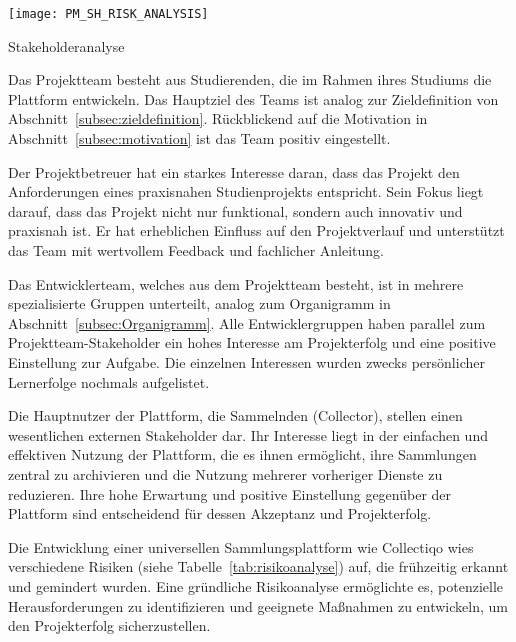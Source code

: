 \begin{table}[h!]
    \centering
    \texttt{[image: PM\_SH\_RISK\_ANALYSIS]}
    \caption{Stakeholderanalyse}\label{tab:stakeholderanalyse}
\end{table}

Das Projektteam besteht aus Studierenden, die im Rahmen ihres Studiums die Plattform entwickeln.
Das Hauptziel des Teams ist analog zur Zieldefinition von Abschnitt~\ref{subsec:zieldefinition}.
Rückblickend auf die Motivation in Abschnitt~\ref{subsec:motivation} ist das Team positiv eingestellt. \par

Der Projektbetreuer hat ein starkes Interesse daran, dass das Projekt den Anforderungen eines praxisnahen Studienprojekts entspricht.
Sein Fokus liegt darauf, dass das Projekt nicht nur funktional, sondern auch innovativ und praxisnah ist.
Er hat erheblichen Einfluss auf den Projektverlauf und unterstützt das Team mit wertvollem Feedback und fachlicher Anleitung. \par

Das Entwicklerteam, welches aus dem Projektteam besteht, ist in mehrere spezialisierte Gruppen unterteilt, analog zum Organigramm in Abschnitt~\ref{subsec:Organigramm}.
Alle Entwicklergruppen haben parallel zum Projektteam-Stakeholder ein hohes Interesse am Projekterfolg und eine positive Einstellung zur Aufgabe.
Die einzelnen Interessen wurden zwecks persönlicher Lernerfolge nochmals aufgelistet. \par

Die Hauptnutzer der Plattform, die Sammelnden (Collector), stellen einen wesentlichen externen Stakeholder dar.
Ihr Interesse liegt in der einfachen und effektiven Nutzung der Plattform, die es ihnen ermöglicht, ihre Sammlungen zentral zu archivieren und die Nutzung mehrerer vorheriger Dienste zu reduzieren.
Ihre hohe Erwartung und positive Einstellung gegenüber der Plattform sind entscheidend für dessen Akzeptanz und Projekterfolg. \par



Die Entwicklung einer universellen Sammlungsplattform wie Collectiqo wies verschiedene Risiken (siehe Tabelle~\ref{tab:risikoanalyse}) auf, die frühzeitig erkannt und gemindert wurden.
Eine gründliche Risikoanalyse ermöglichte es, potenzielle Herausforderungen zu identifizieren und geeignete Maßnahmen zu entwickeln, um den Projekterfolg sicherzustellen.

